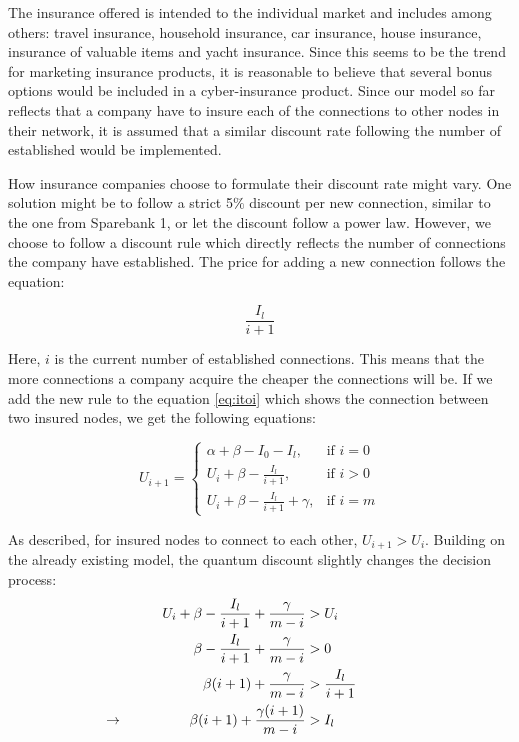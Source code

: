 The insurance offered is intended to the individual market and includes among others: travel insurance, household insurance, car insurance, house insurance, insurance of valuable items and yacht insurance. Since this seems to be the trend for marketing insurance products, it is reasonable to believe that several bonus options would be included in a cyber-insurance product. Since our model so far reflects that a company have to insure each of the connections to other nodes in their network, it is assumed that a similar discount rate following the number of established would be implemented. 

How insurance companies choose to formulate their discount rate might vary. One solution might be to follow a strict 5$\%$ discount per new connection, similar to the one from Sparebank 1, or let the discount follow a power law. However, we choose to follow a discount rule which directly reflects the number of connections the company have established. 
The price for adding a new connection follows the equation:

\begin{equation}
\frac{I_{l}}{i+1}
\label{eq:discount0}
\end{equation}

Here, $i$ is the current number of established connections. This means that the more connections a company acquire the cheaper the connections will be. 
If we add the new rule to the equation \ref{eq:itoi} which shows the connection between two insured nodes, we get the following equations: 

\begin{equation}
    U_{i+1}= 
\begin{cases}
    \alpha + \beta - I_{0} - I_{l},& \text{if } i = 0\\
    U_{i}+\beta -\frac{I_{l}}{i+1},& \text{if }  i>0\\
    U_{i}+\beta -\frac{I_{l}}{i+1}+\gamma,& \text{if } i=m
    
\end{cases}
\label{eq:discount1}
\end{equation}

As described, for insured nodes to connect to each other, $U_{i+1} > U_{i}$. Building on the already existing model, the quantum discount slightly changes the decision process:
\begin{eqnarray}
U_{i}+\beta-\frac{I_{l}}{i+1}+\frac{\gamma}{m-i}&>U_{i} \nonumber \\ 
\beta-\frac{I_{l}}{i+1}+\frac{\gamma}{m-i}&>0 \nonumber \\ 
\beta (i+1)+\frac{\gamma}{m-i}&>\frac{I_{l}}{i+1} \nonumber \\
\llap{$\rightarrow$\hspace{50pt}}  \beta (i+1)+\frac{\gamma (i+1)}{m-i}&>I_{l}
\label{eq:discount2}
\end{eqnarray}

